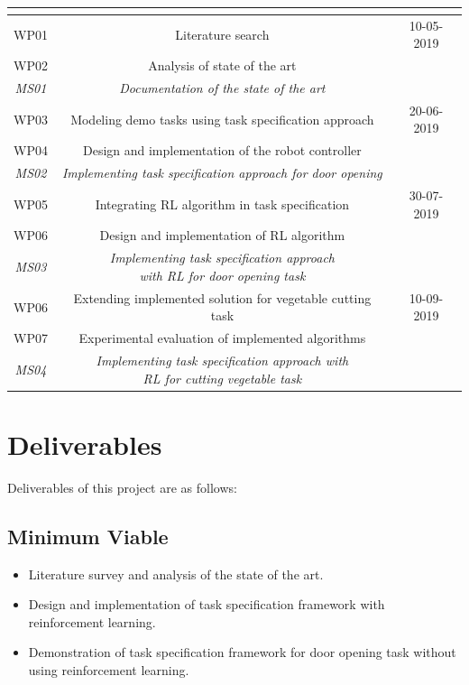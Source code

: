\documentclass[thesis]{mas_proposal}
\begin{document}
\begin{tabular}{|c|c|c|}

	\hline
	\multicolumn{2}{|c|}{\thead{Work Packages}} & \thead{Targeted date} \\
	\hline
	WP01 & Literature search & 10-05-2019 \\
	WP02 & Analysis of state of the art &  \\
	\textit{MS01} & \textit{Documentation of the state of the art} &  \\
	\hline 
	WP03 & Modeling demo tasks using task specification approach &  20-06-2019\\ 
	WP04 & Design and implementation of the robot controller &   \\
	\textit{MS02} & \textit{Implementing task specification approach for door opening} &  \\
	\hline
	WP05 & Integrating RL algorithm in task specification & 30-07-2019 \\ 
	WP06 & Design and implementation of RL algorithm &   \\
	\textit{MS03} & \makecell{\textit{Implementing task specification approach} \\ \textit{with RL for door opening task}} &  \\
	\hline
	WP06 & Extending implemented solution for vegetable cutting task & 10-09-2019 \\ 
	WP07 & Experimental evaluation of implemented algorithms &  \\
	\textit{MS04} & \makecell{\textit{Implementing task specification approach with} \\ \textit{RL for cutting vegetable task}} &  \\
	\hline
\end{tabular}



\section{Deliverables}
Deliverables of this project are as follows: 
\subsection{Minimum Viable}

\begin{itemize}
    \item Literature survey and analysis of the state of the art.
    \item Design and implementation of task specification framework with reinforcement learning.
    \item Demonstration of task specification framework for door opening task without using reinforcement learning.
\end{itemize}
\end{document}
